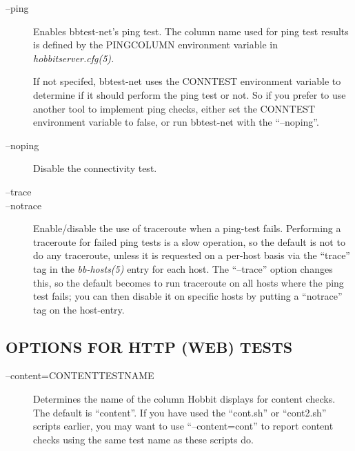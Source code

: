  \begin{description}
\item[--ping] Enables bbtest-net's ping test. The column name used for
  ping test results is defined by the PINGCOLUMN environment variable
  in \emph{hobbitserver.cfg(5).}

 
 If not specifed, bbtest-net uses the CONNTEST environment variable to
 determine if it should perform the ping test or not. So if you prefer
 to use another tool to implement ping checks, either set the CONNTEST
 environment variable to false, or run bbtest-net with the
 ``--noping''. 


 

\item[--noping] Disable the connectivity test. 

 

\item[--trace]
\item[--notrace] Enable/disable the use of traceroute when a ping-test
  fails. Performing a traceroute for failed ping tests is a slow
  operation, so the default is not to do any traceroute, unless it is
  requested on a per-host basis via the ``trace'' tag in the
  \emph{bb-hosts(5) } entry for each host. The ``--trace'' option
  changes this, so the default becomes to run traceroute on all hosts
  where the ping test fails; you can then disable it on specific hosts
  by putting a ``notrace'' tag on the host-entry. 


 


\end{description}

\subsection{OPTIONS FOR HTTP (WEB) TESTS}
\begin{description}
\item[--content=CONTENTTESTNAME] Determines the name of the column
  Hobbit displays for content checks. The default is ``content''. If
  you have used the ``cont.sh'' or ``cont2.sh'' scripts earlier, you
  may want to use ``--content=cont'' to report content checks using
  the same test name as these scripts do. 


\end{description}

